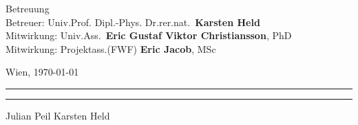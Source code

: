 \begin{titlepage}
    \noindent Betreuung\\
    Betreuer: Univ.Prof. Dipl.-Phys. Dr.rer.nat.\ \textbf{Karsten Held}\\
    Mitwirkung: Univ.Ass.\ \textbf{Eric Gustaf Viktor Christiansson}, PhD\\
    Mitwirkung: Projektass.(FWF) \textbf{Eric Jacob}, MSc    

    \vspace{5em}

    \noindent Wien, \germandateformat\today \hspace{2.5cm}\rule{4.5cm}{0.25pt}\hspace{1cm}\rule{4.5cm}{0.25pt}

	\hspace{5.7cm} Julian Peil \hspace{3.6cm} Karsten Held
\end{titlepage}

